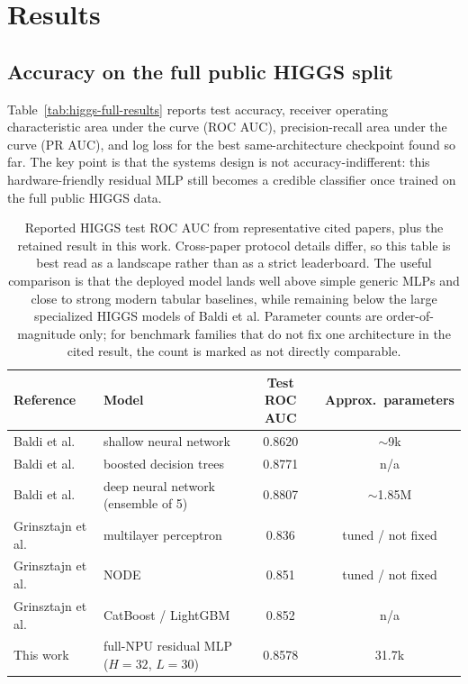 \documentclass[a4paper,11pt]{article}
\begin{document}
\section{Results}

\subsection{Accuracy on the full public HIGGS split}

Table~\ref{tab:higgs-full-results} reports test accuracy, receiver operating
characteristic area under the curve (ROC AUC), precision-recall area under the
curve (PR AUC), and log loss for the best same-architecture checkpoint found so
far. The key point is that the systems design is not accuracy-indifferent: this
hardware-friendly residual MLP still becomes a credible classifier once trained
on the full public HIGGS data.

\begin{table}[t]
\centering
\footnotesize
\begin{tabularx}{\textwidth}{@{}lXcc@{}}
\toprule
Reference & Model & Test ROC AUC & Approx.\ parameters \\
\midrule
Baldi et al.~\cite{baldi-higgs} & shallow neural network & 0.8620 & $\sim$9k \\
Baldi et al.~\cite{baldi-higgs} & boosted decision trees & 0.8771 & n/a \\
Baldi et al.~\cite{baldi-higgs} & deep neural network (ensemble of 5) & 0.8807 & $\sim$1.85M \\
Grinsztajn et al.~\cite{grinsztajn-tabular} & multilayer perceptron & 0.836 & tuned / not fixed \\
Grinsztajn et al.~\cite{grinsztajn-tabular} & NODE & 0.851 & tuned / not fixed \\
Grinsztajn et al.~\cite{grinsztajn-tabular} & CatBoost / LightGBM & 0.852 & n/a \\
This work & full-NPU residual MLP ($H=32$, $L=30$) & 0.8578 & 31.7k \\
\bottomrule
\end{tabularx}
\caption{Reported HIGGS test ROC AUC from representative cited papers, plus the
retained result in this work. Cross-paper protocol details differ, so this
table is best read as a landscape rather than as a strict leaderboard. The
useful comparison is that the deployed model lands well above simple generic
MLPs and close to strong modern tabular baselines, while remaining below the
large specialized HIGGS models of Baldi et al. Parameter counts are
order-of-magnitude only; for benchmark families that do not fix one architecture
in the cited result, the count is marked as not directly comparable.}
\label{tab:higgs-literature}
\end{table}
\end{document}
